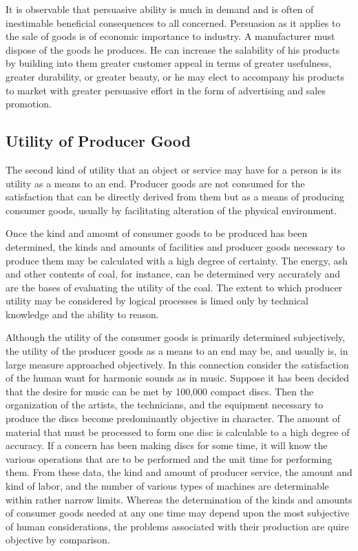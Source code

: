 It is observable that persuasive ability is much in demand and is often of inestimable beneficial consequences to all concerned. Persuasion as it applies to the sale of goods is of economic importance to industry. A manufacturer must dispose of the goods he produces. He can increase the salability of his products by building into them greater customer appeal in terms of greater usefulness, greater durability, or greater beauty, or he may elect to accompany his products to market with greater persuasive effort in the form of advertising and sales promotion.
    
\subsection{Utility of Producer Good}

The second kind of utility that an object or service may have for a person is its utility as a means to an end. Producer goods are not consumed for the satisfaction that can be directly derived from them but as a means of producing consumer goods, usually by facilitating alteration of the physical environment.

Once the kind and amount of consumer goods to be produced has been determined, the kinds and amounts of facilities and producer goods necessary to produce them may be calculated with a high degree of certainty. The energy, ash and other contents of coal, for instance, can be determined very accurately and are the bases of evaluating the utility of the coal. The extent to which producer utility may be considered by logical processes is limed only by technical knowledge and the ability to reason.

Although the utility of the consumer goods is primarily determined subjectively, the utility of the producer goods as a means to an end may be, and usually is, in large measure approached objectively. In this connection consider the satisfaction of the human want for harmonic sounds as in music. Suppose it has been decided that the desire for music can be met by 100,000 compact discs. Then the organization of the artists, the technicians, and the equipment necessary to produce the discs become predominantly objective in character. The amount of material that must be processed to form one disc is calculable to a high degree of accuracy. If a concern has been making discs for some time, it will know the various operations that are to be performed and the unit time for performing them. From these data, the kind and amount of producer service, the amount and kind of labor, and the number of various types of machines are determinable within rather narrow limits. Whereas the determination of the kinds and amounts of consumer goods needed at any one time may depend upon the most subjective of human considerations, the problems associated with their production are quire objective by comparison.